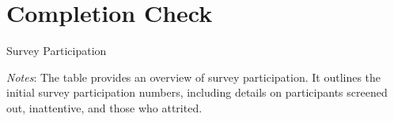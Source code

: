 \documentclass[11pt]{article}
\theoremstyle{definition}
\begin{document}
%     

%     

\section{Completion Check}

%

\begin{table}[H]
    \centering
    \caption{Survey Participation}

     \parbox{.9\linewidth}{
        	\vspace{.2cm}
        		\scriptsize{\scriptsize{{\emph{Notes}: The table provides an overview of survey participation. It outlines the initial survey participation numbers, including details on participants screened out, inattentive, and those who attrited.}}}}
    \label{tab:completioncheck}
\end{table}
\end{document}
